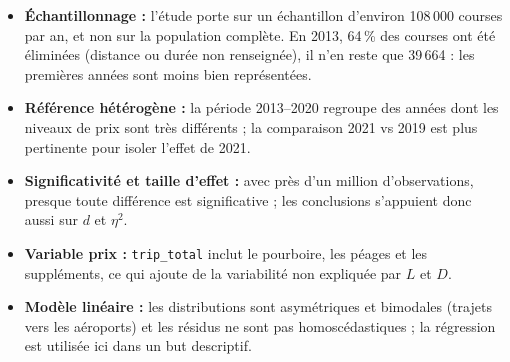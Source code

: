 \documentclass[11pt,a4paper]{article}
\begin{document}
\begin{itemize}
  \item \textbf{Échantillonnage :} l'étude porte sur un échantillon d'environ 108\,000 courses par an, et non sur
        la population complète. En 2013, 64\,\% des courses ont été éliminées (distance ou durée non
        renseignée), il n'en reste que 39\,664 : les premières années sont moins bien représentées.
  \item \textbf{Référence hétérogène :} la période 2013--2020 regroupe des années dont les niveaux de prix sont
        très différents ; la comparaison 2021 vs 2019 est plus pertinente pour isoler l'effet de 2021.
  \item \textbf{Significativité et taille d'effet :} avec près d'un million d'observations, presque toute
        différence est significative ; les conclusions s'appuient donc aussi sur $d$ et $\eta^2$.
  \item \textbf{Variable prix :} \texttt{trip\_total} inclut le pourboire, les péages et les suppléments, ce qui
        ajoute de la variabilité non expliquée par $L$ et $D$.
  \item \textbf{Modèle linéaire :} les distributions sont asymétriques et bimodales (trajets vers les aéroports)
        et les résidus ne sont pas homoscédastiques ; la régression est utilisée ici dans un but descriptif.
\end{itemize}
\end{document}
